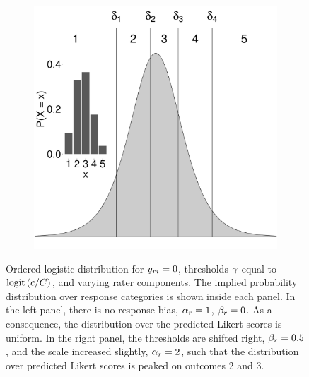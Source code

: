 \documentclass[a4paper]{article}
\begin{document}
\begin{figure}[!ht]
\begin{subfigure}{.5\textwidth}
		\includegraphics[width=.97\textwidth]{figures/orderedLogisticBiased.pdf}
	\end{subfigure}
	\caption{Ordered logistic distribution for $y_{ri} = 0$, thresholds $\gamma$ equal to $\text{logit}\left(c/C\right)$, and varying rater components. The implied probability distribution over response categories is shown inside each panel. In the left panel, there is no response bias, $\alpha_r = 1$, $\beta_r = 0$. As a consequence, the distribution over the predicted Likert scores is uniform. In the right panel, the thresholds are shifted right, $\beta_r = 0.5$, and the scale increased slightly, $\alpha_r = 2$, such that the distribution over predicted Likert scores is peaked on outcomes 2 and 3.}
	\label{fig:orderedLogistic}
\end{figure}
\end{document}
